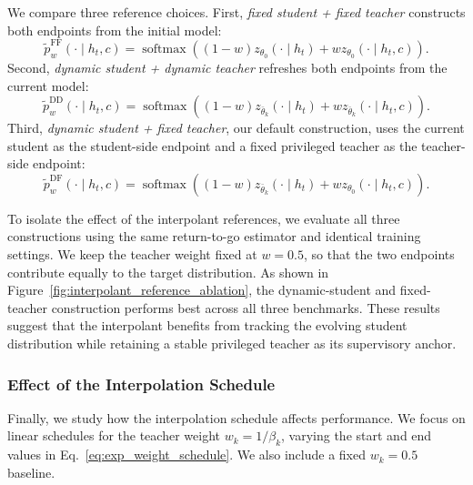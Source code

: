 We compare three reference choices. First, \emph{fixed student + fixed teacher} constructs
both endpoints from the initial model:
\begin{equation}
    \tilde p_{w}^{\mathrm{FF}}
    (\cdot\mid h_t,c)
    =
    \operatorname{softmax}
    \left(
    (1-w)z_{\theta_0}(\cdot\mid h_t)
    +
    w z_{\theta_0}(\cdot\mid h_t,c)
    \right).
    \label{eq:fixed_fixed_interpolant}
\end{equation}
Second, \emph{dynamic student + dynamic teacher} refreshes both endpoints from the
current model:
\begin{equation}
    \tilde p_{w}^{\mathrm{DD}}
    (\cdot\mid h_t,c)
    =
    \operatorname{softmax}
    \left(
    (1-w)z_{\bar{\theta}_k}(\cdot\mid h_t)
    +
    w z_{\bar{\theta}_k}(\cdot\mid h_t,c)
    \right).
    \label{eq:dynamic_dynamic_interpolant}
\end{equation}
Third, \emph{dynamic student + fixed teacher}, our default construction, uses the current
student as the student-side endpoint and a fixed privileged teacher as the teacher-side
endpoint:
\begin{equation}
    \tilde p_{w}^{\mathrm{DF}}
    (\cdot\mid h_t,c)
    =
    \operatorname{softmax}
    \left(
    (1-w)z_{\bar{\theta}_k}(\cdot\mid h_t)
    +
    w z_{\theta_0}(\cdot\mid h_t,c)
    \right).
    \label{eq:dynamic_fixed_interpolant}
\end{equation}

To isolate the effect of the interpolant references, we evaluate all three constructions using
the same return-to-go estimator and identical training settings. We keep the teacher weight
fixed at $w=0.5$, so that the two endpoints contribute equally to the target distribution.
As shown in Figure~\ref{fig:interpolant_reference_ablation}, the dynamic-student and
fixed-teacher construction performs best across all three benchmarks. These results suggest
that the interpolant benefits from tracking the evolving student distribution while retaining
a stable privileged teacher as its supervisory anchor.




\subsubsection{Effect of the Interpolation Schedule}
\label{sec:ablation_interpolation_schedule}

Finally, we study how the interpolation schedule affects performance. We focus on linear
schedules for the teacher weight $w_k=1/\beta_k$, varying the start and end values in
Eq.~\ref{eq:exp_weight_schedule}. We also include a fixed $w_k=0.5$ baseline.

